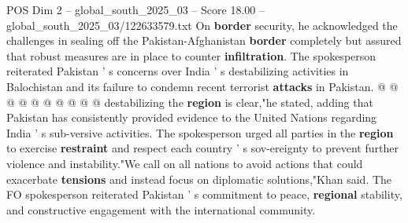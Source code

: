 \begin{textsample}{POS Dim 2 – global\_south\_2025\_03 – Score 18.00 – global\_south\_2025\_03/122633579.txt}
On \textbf{border} security, he acknowledged the challenges in sealing off the Pakistan-Afghanistan \textbf{border} completely but assured that robust measures are in place to counter \textbf{infiltration}.
The spokesperson reiterated Pakistan ' s concerns over India ' s destabilizing activities in Balochistan and its failure to condemn recent terrorist \textbf{attacks} in Pakistan. @ @ @ @ @ @ @ @ @ @ destabilizing the \textbf{region} is clear,"he stated, adding that Pakistan has consistently provided evidence to the United Nations regarding India ' s sub-versive activities.
The spokesperson urged all parties in the \textbf{region} to exercise \textbf{restraint} and respect each country ' s sov-ereignty to prevent further violence and instability."We call on all nations to avoid actions that could exacerbate \textbf{tensions} and instead focus on diplomatic solutions,"Khan said.
The FO spokesperson reiterated Pakistan ' s commitment to peace, \textbf{regional} stability, and constructive engagement with the international community.

\end{textsample}

